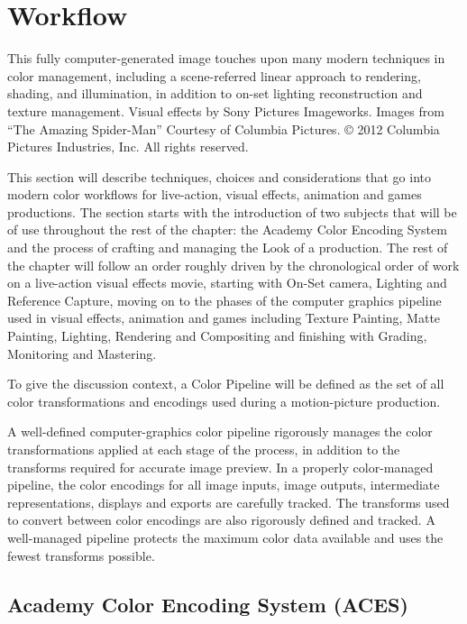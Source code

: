 \chapter{Workflow}

This fully computer-generated image touches upon many modern techniques in color management, including a scene-referred linear approach to rendering, shading, and illumination, in addition to on-set lighting reconstruction and texture management. 
Visual effects by Sony Pictures Imageworks. Images from “The Amazing Spider-Man” Courtesy of Columbia Pictures. © 2012 Columbia Pictures Industries, Inc. All rights reserved.

This section will describe techniques, choices and considerations that go into modern color workflows for live-action, visual effects, animation and games productions. The section starts with the introduction of two subjects that will be of use throughout the rest of the chapter: the Academy Color Encoding System and the process of crafting and managing the Look of a production. The rest of the chapter will follow an order roughly driven by the chronological order of work on a live-action visual effects movie, starting with On-Set camera, Lighting and Reference Capture, moving on to the phases of the computer graphics pipeline used in visual effects, animation and games including Texture Painting, Matte Painting, Lighting, Rendering and Compositing and finishing with Grading, Monitoring and Mastering.

To give the discussion context, a Color Pipeline will be defined as the set of all color transformations and encodings used during a motion-picture production.

A well-defined computer-graphics color pipeline rigorously manages the color transformations applied at each stage of the process, in addition to the transforms required for accurate image preview.
In a properly color-managed pipeline, the color encodings for all image inputs, image outputs, intermediate representations, displays and exports are carefully tracked. The transforms used to convert between color encodings are also rigorously defined and tracked. A well-managed pipeline protects the maximum color data available and uses the fewest transforms possible.  

\section{Academy Color Encoding System (ACES)}

